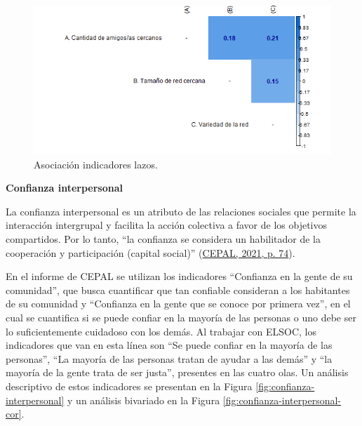\documentclass[
  12pt,
]{book}
\begin{document}
\begin{figure}[H]

{\centering \includegraphics[width=1\linewidth,height=1\textheight]{output/graphs/lazos_cor} 

}

\caption{Asociación indicadores lazos.}\label{fig:lazos-cor}
\end{figure}

\textbf{Confianza interpersonal}

La confianza interpersonal es un atributo de las relaciones sociales que permite la interacción intergrupal y facilita la acción colectiva a favor de los objetivos compartidos. Por lo tanto, ``la confianza se considera un habilitador de la cooperación y participación (capital social)'' (\protect\hyperlink{ref-cepal_Cohesion_2021}{CEPAL, 2021, p. 74}).

En el informe de CEPAL se utilizan los indicadores ``Confianza en la gente de su comunidad'', que busca cuantificar que tan confiable consideran a los habitantes de su comunidad y ``Confianza en la gente que se conoce por primera vez'', en el cual se cuantifica si se puede confiar en la mayoría de las personas o uno debe ser lo suficientemente cuidadoso con los demás. Al trabajar con ELSOC, los indicadores que van en esta línea son ``Se puede confiar en la mayoría de las personas'', ``La mayoría de las personas tratan de ayudar a las demás'' y ``la mayoría de la gente trata de ser justa'', presentes en las cuatro olas. Un análisis descriptivo de estos indicadores se presentan en la Figura \ref{fig:confianza-interpersonal} y un análisis bivariado en la Figura \ref{fig:confianza-interpersonal-cor}.
\end{document}
